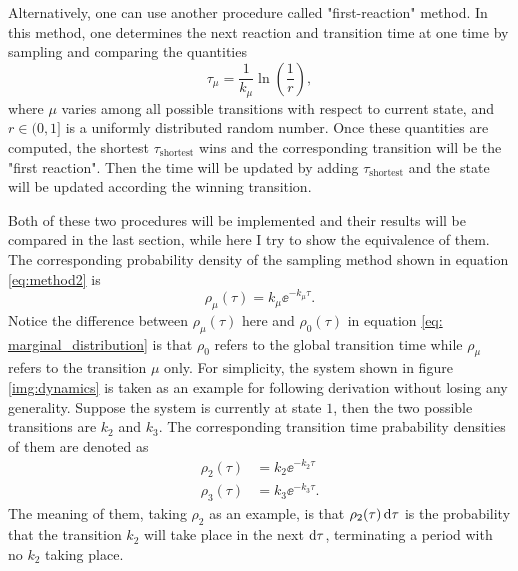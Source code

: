 		Alternatively, one can use another procedure called "first-reaction" method. In this method, one determines the next reaction and transition time at one time by sampling and comparing the quantities
		\begin{equation}
			\tau_\mu = \frac{1}{k_\mu}\ln{\left(\frac{1}{r}\right)},
			\label{eq:method2}
		\end{equation}
		where $\mu$ varies among all possible transitions with respect to current state, and $r \in (0,1]$ is a uniformly distributed random number. Once these quantities are computed, the shortest $\tau_{\text{shortest}}$ wins and the corresponding transition will be the "first reaction". Then the time will be updated by adding $\tau_{\text{shortest}}$ and the state will be updated according the winning transition.

		Both of these two procedures will be implemented and their results will be compared in the last section, while here I try to show the equivalence of them. The corresponding probability density of the sampling method shown in equation \eqref{eq:method2} is
		\begin{equation}
			\rho_\mu(\tau) = k_\mu \ee^{-k_\mu\tau}.
			\label{eq:partial_tau_prob}
		\end{equation}
		Notice the difference between $\rho_\mu(\tau)$ here and $\rho_0(\tau)$ in equation \eqref{eq: marginal_distribution} is that $\rho_0$ refers to the global transition time while $\rho_\mu$ refers to the transition $\mu$ only. For simplicity, the system shown in figure \ref{img:dynamics} is taken as an example for following derivation without losing any generality. Suppose the system is currently at state $1$, then the two possible transitions are $k_2$ and $k_3$. The corresponding transition time prabability densities of them are denoted as
		\begin{equation}
			\begin{aligned}
			\rho_2(\tau) &= k_2 \ee^{-k_2\tau} \\
			\rho_3(\tau) &= k_3 \ee^{-k_3\tau}.
			\end{aligned}
		\end{equation}
		The meaning of them, taking $\rho_2$ as an example, is that $\rho_2(\tau)\operatorname{d\!} \tau$ is the probability that the transition $k_2$ will take place in the next $\operatorname{d\!} \tau$, terminating a period with no $k_2$ taking place. 

